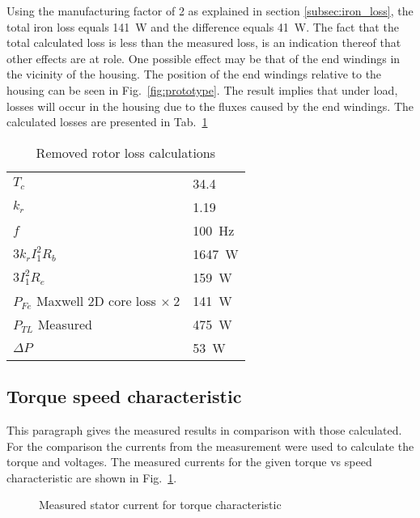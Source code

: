 Using the manufacturing factor of 2 as explained in section \ref{subsec:iron_loss}, the total iron loss equals \SI{141}{W} and the difference equals \SI{41}{W}. The fact that the total calculated loss is less than the measured loss, is an indication thereof that other effects are at role. One possible effect may be that of the end windings in the vicinity of the housing. The position of the end windings relative to the housing can be seen in Fig.~\ref{fig:prototype}. The result implies that under load, losses will occur in the housing due to the fluxes caused by the end windings. The calculated losses are presented in Tab.~\ref{tab:RemovedRotorLossCalculations}
\begin{table}[htbp]
	\centering
	\caption{Removed rotor loss calculations}
	\begin{tabular}{ll}
		\hline
		$T_c$                                 & \SI{34.4}{\degC}       \\
		$k_r$                                 & \num{1.19}             \\
		$f$                                   & \SI{100}{Hz}           \\
		$3k_rI_{1}^{2}R_b$                    & \SI{1647}{W}           \\
		$3I_{1}^{2}R_e$                       & \SI{159}{W}            \\	
		$P_{Fe}$ Maxwell 2D core loss $\times\:2$ & \SI{141}{W}  \\
		$P_{TL}$ Measured                     & \SI{475}{W}            \\
		\hline
		$\Delta P$                            & \SI{53}{W}             \\
	  \hline
	\end{tabular}
	\label{tab:RemovedRotorLossCalculations}
\end{table}

\subsection{Torque speed characteristic}
This paragraph gives the measured results in comparison with those calculated. For the comparison the currents from the measurement were used to calculate the torque and voltages. The measured currents for the given torque vs speed characteristic are shown in Fig.~\ref{fig:I1_measured}.
\begin{figure}[htbp]
	\centering
		
	\caption{Measured stator current for torque characteristic}
	\label{fig:I1_measured}
\end{figure}


